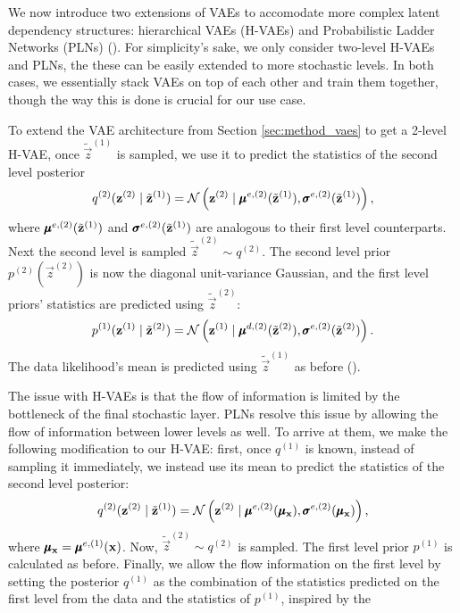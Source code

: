 \par
We now introduce two extensions of VAEs to accomodate more complex latent
dependency structures: hierarchical VAEs (H-VAEs) and Probabilistic Ladder
Networks (PLNs) (\cite{sonderby2016train}). For simplicity's sake, we only
consider two-level H-VAEs and PLNs, the these can be easily extended to more
stochastic levels. In both cases, we essentially stack VAEs on top of each
other and train them together, though the way this is done is crucial for our
use case.

\par
To extend the VAE architecture from Section \ref{sec:method_vaes} to get a
2-level H-VAE, once $\tilde{\vec{z}}^{(1)}$ is sampled, we use it to predict
the statistics of the second level posterior
\[
  q^{(2)}(\mathbf{z}^{(2)} \mid \tilde{\mathbf{z}}^{(1)}) = \mathcal{N}\left( \mathbf{z}^{(2)} \mid 
  \pmb{\mu}^{e, (2)}(\tilde{\mathbf{z}}^{(1)}), \pmb{\sigma}^{e, (2)}(\tilde{\mathbf{z}}^{(1)}) \right),
\]
where $\pmb{\mu}^{e, (2)}(\tilde{\mathbf{z}}^{(1)})$ and
$\pmb{\sigma}^{e, (2)}(\tilde{\mathbf{z}}^{(1)})$ are analogous to their first level
counterparts. Next the second level is sampled $\tilde{\vec{z}}^{(2)} \sim
q^{(2)}$. The second level prior $p^{(2)}(\vec{z}^{(2)})$ is now the diagonal
unit-variance Gaussian, and the first level priors' statistics are predicted
using $\tilde{\vec{z}}^{(2)}$:
\[
  p^{(1)}(\mathbf{z}^{(1)} \mid \tilde{\mathbf{z}}^{(2)}) =
  \mathcal{N}\left( \mathbf{z}^{(1)} \mid \pmb{\mu}^{d, (2)}(\tilde{\mathbf{z}}^{(2)}),
    \pmb{\sigma}^{e, (2)}(\tilde{\mathbf{z}}^{(2)}) \right).
\] 
The data likelihood's mean is predicted using $\tilde{\vec{z}}^{(1)}$ as before
(\cite{sonderby2016train}).
\par
The issue with H-VAEs is that the flow of information is limited by the
bottleneck of the final stochastic layer. PLNs resolve this issue by allowing
the flow of information between lower levels as well. To arrive at them, we
make the following modification to our H-VAE: first, once $q^{(1)}$ is known,
instead of sampling it immediately, we instead use its mean to predict the
statistics of the second level posterior:
\[
  q^{(2)}(\mathbf{z}^{(2)} \mid \tilde{\mathbf{z}}^{(1)}) = \mathcal{N}\left( \mathbf{z}^{(2)} \mid 
  \pmb{\mu}^{e, (2)}(\pmb{\mu}_{\mathbf{x}}), \pmb{\sigma}^{e, (2)}(\pmb{\mu}_{\mathbf{x}}) \right),
\]
where $\pmb{\mu}_{\mathbf{x}} = \pmb{\mu}^{e, (1)}(\mathbf{x})$. Now, $\tilde{\vec{z}}^{(2)} \sim
q^{(2)}$ is sampled. The first level prior $p^{(1)}$ is calculated as before.
Finally, we allow the flow information on the first level by setting the
posterior $q^{(1)}$ as the combination of the statistics predicted on the first
level from the data and the statistics of $p^{(1)}$, inspired by the
